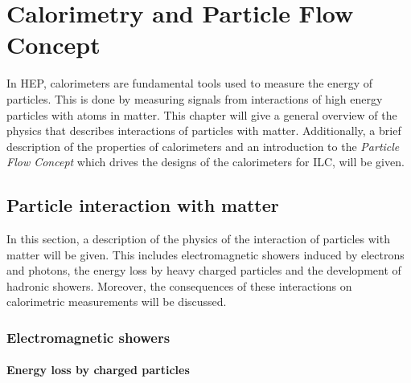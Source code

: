 \chapter{Calorimetry and Particle Flow Concept}

In HEP, calorimeters are fundamental tools used to measure the energy of particles. This is done by measuring signals from interactions of high energy particles with atoms in matter. This chapter will give a general overview of the physics that describes interactions of particles with matter. Additionally, a brief description of the properties of calorimeters and an introduction to the \textit{Particle Flow Concept} which drives the designs of the calorimeters for ILC, will be given.

\section{Particle interaction with matter}
\label{sec:PartInter}

In this section, a description of the physics of the interaction of particles with matter will be given. This includes electromagnetic showers induced by electrons and photons, the energy loss by heavy charged particles and the development of hadronic showers. Moreover, the consequences of these interactions on calorimetric measurements will be discussed.

\subsection{Electromagnetic showers}
\label{subsec:EMShowers}

\subsubsection{Energy loss by charged particles}


